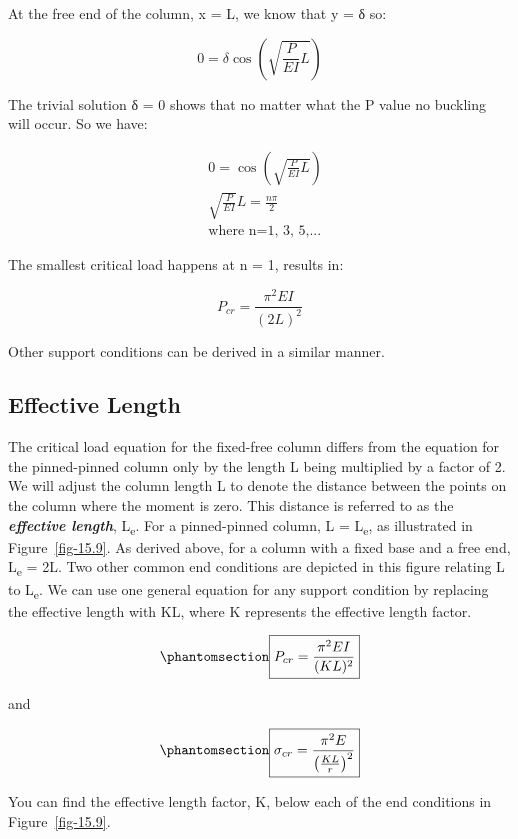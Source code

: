 \documentclass[
  letterpaper,
  DIV=11,
  numbers=noendperiod]{scrreprt}
\theoremstyle{definition}
\theoremstyle{remark}
\begin{document}
At the free end of the column, x = L, we know that y = δ so:

\[
0=\delta \cos \left(\sqrt{\frac{P}{E I} L}\right)
\]

The trivial solution δ = 0 shows that no matter what the P value no
buckling will occur. So we have:

\[
\begin{aligned}
& 0=\cos \left(\sqrt{\frac{P}{E I} L}\right) \\
& \sqrt{\frac{P}{E I}} L=\frac{n \pi}{2} \\
& \text{where n=1, 3, 5,...}
\end{aligned}
\]

The smallest critical load happens at n = 1, results in:

\[
P_{c r}=\frac{\pi^2 E I}{(2 L)^2}
\]

Other support conditions can be derived in a similar manner.

\subsection{Effective Length}\label{effective-length}

The critical load equation for the fixed-free column differs from the
equation for the pinned-pinned column only by the length L being
multiplied by a factor of 2. We will adjust the column length L to
denote the distance between the points on the column where the moment is
zero. This distance is referred to as the \textbf{\emph{effective
length}}, L\textsubscript{e}. For a pinned-pinned column, L =
L\textsubscript{e}, as illustrated in Figure~\ref{fig-15.9}. As derived
above, for a column with a fixed base and a free end, L\textsubscript{e}
= 2L. Two other common end conditions are depicted in this figure
relating L to L\textsubscript{e}. We can use one general equation for
any support condition by replacing the effective length with KL, where K
represents the effective length factor.

\begin{equation}\phantomsection\label{eq-15.3}{
\boxed{P_{c r}=\frac{\pi^2 E I}{(K L)^2}}
}\end{equation}

and

\begin{equation}\phantomsection\label{eq-15.4}{
\boxed{\sigma_{c r}=\frac{\pi^2 E}{\left(\frac{K L}{r}\right)^2}}
}\end{equation}

You can find the effective length factor, K, below each of the end
conditions in Figure~\ref{fig-15.9}.
\end{document}
